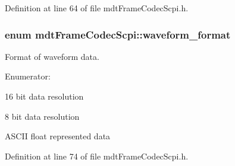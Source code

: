 Definition at line 64 of file mdtFrameCodecScpi.h.

\hypertarget{classmdt_frame_codec_scpi_a1aafb008a4207cc922f46fe905b3f17d}{
\subsubsection[{waveform\_\-format}]{\setlength{\rightskip}{0pt plus 5cm}enum {\bf mdtFrameCodecScpi::waveform\_\-format}}}
\label{classmdt_frame_codec_scpi_a1aafb008a4207cc922f46fe905b3f17d}


Format of waveform data. 

\begin{Desc}
\item[Enumerator: ]\par
\begin{description}
\item[{\em 
\hypertarget{classmdt_frame_codec_scpi_a1aafb008a4207cc922f46fe905b3f17da7f4b47afe74504dea43bb04c8c6fbe58}{
WORD}
\label{classmdt_frame_codec_scpi_a1aafb008a4207cc922f46fe905b3f17da7f4b47afe74504dea43bb04c8c6fbe58}
}]16 bit data resolution \item[{\em 
\hypertarget{classmdt_frame_codec_scpi_a1aafb008a4207cc922f46fe905b3f17daad91226f87cea7fab38f5cc7618f424c}{
BYTE}
\label{classmdt_frame_codec_scpi_a1aafb008a4207cc922f46fe905b3f17daad91226f87cea7fab38f5cc7618f424c}
}]8 bit data resolution \item[{\em 
\hypertarget{classmdt_frame_codec_scpi_a1aafb008a4207cc922f46fe905b3f17da957445cd510a5c4e6964e9b79e73af4d}{
ASCII}
\label{classmdt_frame_codec_scpi_a1aafb008a4207cc922f46fe905b3f17da957445cd510a5c4e6964e9b79e73af4d}
}]ASCII float represented data \end{description}
\end{Desc}



Definition at line 74 of file mdtFrameCodecScpi.h.



